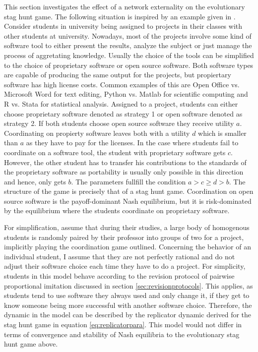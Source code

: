 \label{sec:simplemodel}
This section investigates the effect of a network externality on the
evolutionary stag hunt game. The following situation is inspired by an
example given in \textcite{kandori_learning_1993}. 
Consider students in university being assigned to
projects in their classes with other students at university. 
Nowadays, most of the projects involve some kind of software tool to either 
present the results, analyze the subject or just manage the process of aggretating 
knowledge. Usually the choice of the tools can be simplified to 
the choice of proprietary software or open source software. 
Both software types are capable of producing the same output for the
projects, but propiertary software has high license costs.
Common examples of this are Open Office vs. Microsoft Word for text editing,
Python vs. Matlab for scientific computing and R vs. Stata for statistical
analysis. Assigned to a project, students can either choose proprietary
software denoted as strategy 1 or open software denoted as strategy 2.
If both students choose open source software they receive utility $a$.
Coordinating on propierty software leaves both with a utility $d$ which is
smaller than $a$ as they have to pay for the licenses. In the case 
where students fail to coordinate on a software tool, the student
with proprietary software gets $c$. However, the other student
has to transfer his contributions to the standards of the proprietary software
as portability is usually only possible in this direction and hence, only 
gets $b$. The parameters fullfill the condition $a > c \geq d >b$.
The structure of the game is precisely that of a stag hunt game. 
Coordination on open source software is the payoff-dominant Nash equilibrium,
but it is risk-dominated by the equilibrium where the students coordinate on
proprietary software. 

For simplification, assume that during their studies, a large body of 
homogenous students is randomly paired by their professor into groups of two 
for a project, implicitly playing the coordination game outlined. 
Concerning the behavior of an individual student, I assume that they are 
not perfectly rational and do not adjust their software choice 
each time they have to do a project.
For simplicity, students in this model behave according to the 
revision protocol of pairwise proportional imitation discussed in section 
\ref{sec:revisionprotocols}. 
This applies, as students tend to use software they always used and 
only change it, if they get to know someone being more successful with
another software choice. Therefore, the dynamic in the model can be 
described by the replicator dynamic derived for the stag hunt game in 
equation \eqref{eq:replicatorpara}.
This model would not differ in terms of convergence and stability of Nash 
equilibria to the evolutionary stag hunt game above.

